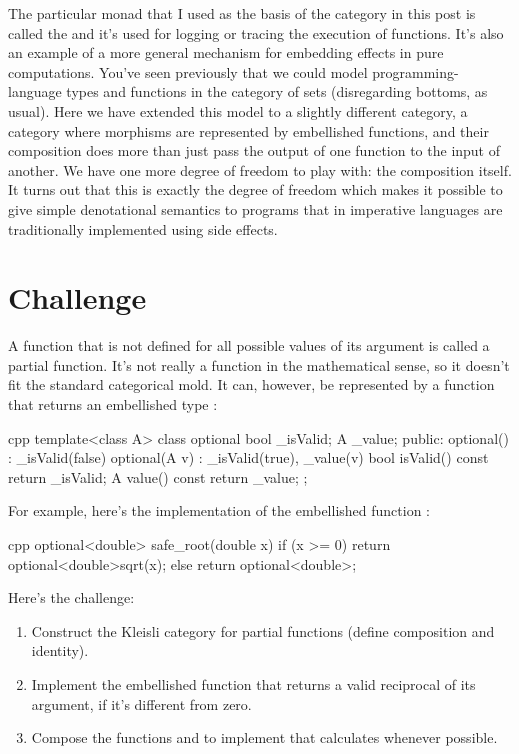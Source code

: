 The particular monad that I used as the basis of the category in this
post is called the  and it's used for logging or
tracing the execution of functions. It's also an example of a more
general mechanism for embedding effects in pure computations. You've
seen previously that we could model programming-language types and
functions in the category of sets (disregarding bottoms, as usual). Here
we have extended this model to a slightly different category, a category
where morphisms are represented by embellished functions, and their
composition does more than just pass the output of one function to the
input of another. We have one more degree of freedom to play with: the
composition itself. It turns out that this is exactly the degree of
freedom which makes it possible to give simple denotational semantics to
programs that in imperative languages are traditionally implemented
using side effects.

\section{Challenge}

A function that is not defined for all possible values of its argument
is called a partial function. It's not really a function in the
mathematical sense, so it doesn't fit the standard categorical mold. It
can, however, be represented by a function that returns an embellished
type :

\begin{snip}{cpp}
template<class A> class optional {
    bool _isValid;
    A _value;
public: 
    optional()    : _isValid(false) {}
    optional(A v) : _isValid(true), _value(v) {}
    bool isValid() const { return _isValid; }
    A value() const { return _value; }
};
\end{snip}
For example, here's the implementation of the embellished function
:

\begin{snip}{cpp}
optional<double> safe_root(double x) {
    if (x >= 0) return optional<double>{sqrt(x)}; 
    else return optional<double>{};
}
\end{snip}
Here's the challenge:

\begin{enumerate}
\tightlist
\item
  Construct the Kleisli category for partial functions (define
  composition and identity).
\item
  Implement the embellished function  that
  returns a valid reciprocal of its argument, if it's different from
  zero.
\item
  Compose the functions  and  to implement
   that calculates 
  whenever possible.
\end{enumerate}